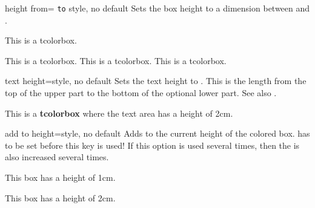 \begin{docTcbKey}{height from}{= \texttt{to} }{style, no default}
  Sets the box height to a dimension between  and .
\begin{dispExample}

\begin{mybox}
This is a tcolorbox.
\end{mybox}
\begin{mybox}
This is a tcolorbox. This is a tcolorbox. This is a tcolorbox.
\end{mybox}
\begin{mybox}
\lipsum[2]
\end{mybox}
\end{dispExample}
\end{docTcbKey}


\begin{docTcbKey}[][doc new=2014-10-31]{text height}{=}{style, no default}
  Sets the text height to . This is the length from the top
  of the upper part to the bottom of the optional lower part.
  See also .
\begin{dispExample}

\begin{tcolorbox}[text height=2cm]
This is a \textbf{tcolorbox} where the text area has a height of 2cm.
\end{tcolorbox}
\end{dispExample}
\end{docTcbKey}

\clearpage

\begin{docTcbKey}[][doc new=2014-11-07]{add to height}{=}{style, no default}
  Adds  to the current height of the colored box.
   has to be set before this key is used!
  If this option is used several times, then the  is
  also increased several times.
\begin{dispExample}

\begin{tcolorbox}
  This box has a height of 1cm.
\end{tcolorbox}
\begin{tcolorbox}[add to height=1cm]
  This box has a height of 2cm.
\end{tcolorbox}
\end{dispExample}
\end{docTcbKey}


